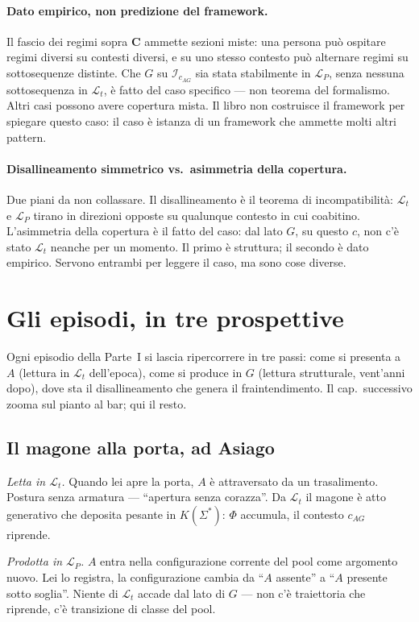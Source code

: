 \documentclass[
    oneside,                 %
    openany,                 %
    titlepage,
    11pt,
    a4paper,
    italian,
    DIV=14,                  %
    headinclude,
    footinclude=true,
    cleardoublepage=empty
]{scrbook}
\theoremstyle{ctplain}
\theoremstyle{ctdef}
\theoremstyle{ctrem}
\newcommand{\Lt}{\mathcal{L}_t}
\newcommand{\LP}{\mathcal{L}_P}
\newcommand{\Phii}{\Phi}
\newcommand{\KSigma}{K(\Sigma^{*})}
\begin{document}
\paragraph{Dato empirico, non predizione del framework.} Il fascio dei regimi sopra $\mathbf{C}$ ammette sezioni miste: una persona può ospitare regimi diversi su contesti diversi, e su uno stesso contesto può alternare regimi su sottosequenze distinte. Che $G$ su $\mathcal{I}_{c_{AG}}$ sia stata stabilmente in $\LP$, senza nessuna sottosequenza in $\Lt$, è fatto del caso specifico --- non teorema del formalismo. Altri casi possono avere copertura mista. Il libro non costruisce il framework per spiegare questo caso: il caso è istanza di un framework che ammette molti altri pattern.

\paragraph{Disallineamento simmetrico vs.~asimmetria della copertura.} Due piani da non collassare. Il disallineamento è il teorema di incompatibilità: $\Lt$ e $\LP$ tirano in direzioni opposte su qualunque contesto in cui coabitino. L'asimmetria della copertura è il fatto del caso: dal lato $G$, su questo $c$, non c'è stato $\Lt$ neanche per un momento. Il primo è struttura; il secondo è dato empirico. Servono entrambi per leggere il caso, ma sono cose diverse.

\section*{Gli episodi, in tre prospettive}

Ogni episodio della Parte~I si lascia ripercorrere in tre passi: come si presenta a $A$ (lettura in $\Lt$ dell'epoca), come si produce in $G$ (lettura strutturale, vent'anni dopo), dove sta il disallineamento che genera il fraintendimento. Il cap.~successivo zooma sul pianto al bar; qui il resto.

\subsection*{Il magone alla porta, ad Asiago}

\emph{Letta in $\Lt$.} Quando lei apre la porta, $A$ è attraversato da un trasalimento. Postura senza armatura --- ``apertura senza corazza''. Da $\Lt$ il magone è atto generativo che deposita pesante in $\KSigma$: $\Phii$ accumula, il contesto $c_{AG}$ riprende.

\emph{Prodotta in $\LP$.} $A$ entra nella configurazione corrente del pool come argomento nuovo. Lei lo registra, la configurazione cambia da ``$A$ assente'' a ``$A$ presente sotto soglia''. Niente di $\Lt$ accade dal lato di $G$ --- non c'è traiettoria che riprende, c'è transizione di classe del pool.
\end{document}
